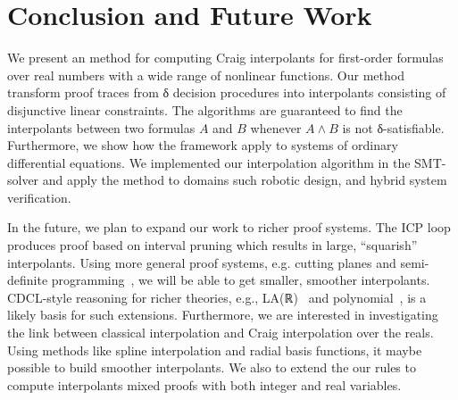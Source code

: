 \section{Conclusion and Future Work}
\label{sec:concl}

We present an method for computing Craig interpolants for first-order formulas over real numbers with a wide range of nonlinear functions.
Our method transform proof traces from δ decision procedures into interpolants consisting of disjunctive linear constraints.
The algorithms are guaranteed to find the interpolants between two formulas $A$ and $B$ whenever $A ∧ B$ is not δ-satisfiable.
Furthermore, we show how the framework apply to systems of ordinary differential equations.
We implemented our interpolation algorithm in the \dReal SMT-solver and apply the method to domains such robotic design, and hybrid system verification.  

In the future, we plan to expand our work to richer proof systems.
The ICP loop produces proof based on interval pruning which results in large, ``squarish'' interpolants.
Using more general proof systems, e.g. cutting planes and semi-definite programming~\cite{DBLP:conf/cav/DaiXZ13}, we will be able to get smaller, smoother interpolants.
CDCL-style reasoning for richer theories, e.g., LA(ℝ)~\cite{DBLP:conf/cav/McMillanKS09} and polynomial~\cite{DBLP:conf/cade/JovanovicM12}, is a likely basis for such extensions.
Furthermore, we are interested in investigating the link between classical interpolation and Craig interpolation over the reals.
Using methods like spline interpolation and radial basis functions, it maybe possible to build smoother interpolants.
We also to extend the our rules to compute interpolants mixed proofs with both integer and real variables.
